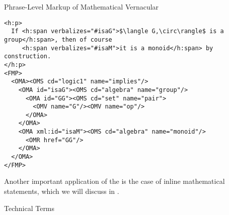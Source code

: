 \begin{module}[id=mtext]
\begin{omgroup}[id=mtext,short=Mathematical Text]
\begin{omgroup}[id=phrases]{Phrase-Level Markup of Mathematical Vernacular}
\begin{example}[display=flow]
\begin{lstlisting}[label=lst:parallel-formal-informal,mathescape,
  caption=Parallel Markup between Formal and Informal,
  index={h:span,h:p,FMP}]
<h:p>
  If <h:span verbalizes="#isaG">$\langle G,\circ\rangle$ is a group</h:span>, then of course
     <h:span verbalizes="#isaM">it is a monoid</h:span> by construction.
</h:p>
<FMP>
  <OMA><OMS cd="logic1" name="implies"/>
    <OMA id="isaG"><OMS cd="algebra" name="group"/>
      <OMA id="GG"><OMS cd="set" name="pair">
        <OMV name="G"/><OMV name="op"/>
      </OMA>
    </OMA>
    <OMA xml:id="isaM"><OMS cd="algebra" name="monoid"/>
      <OMR href="GG"/>
    </OMA>
  </OMA>
</FMP>
\end{lstlisting}
\end{example}
Another important application of the {} is the case of
inline mathematical statements, which we will discuss in {}.

\end{omgroup}


\begin{omgroup}[id=terms]{Technical Terms}


\end{omgroup}
\end{omgroup}
\end{module}
